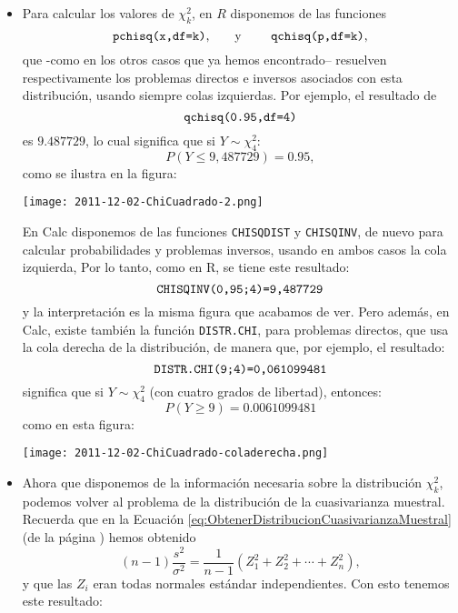 \begin{itemize}
    \item Para calcular los valores de $\chi^2_k$, en $R$ disponemos de las funciones
        \[\mbox{{\tt pchisq(x,df=k)},\qquad y \qquad {\tt qchisq(p,df=k)},}\]
        que -como en los otros casos que ya hemos encontrado-- resuelven respectivamente los problemas directos e inversos asociados con esta distribución, usando siempre colas izquierdas. Por ejemplo, el resultado de    \[\mbox{\tt qchisq(0.95,df=4)}\]
        es $9.487729$, lo cual significa que si $Y\sim\chi^2_4$:
        \[P(Y\leq 9,487729)=0.95,\]
        como se ilustra en la figura:
        \begin{center}
        \texttt{[image: 2011-12-02-ChiCuadrado-2.png]}
        \end{center}
        En Calc disponemos de las funciones {\tt CHISQDIST} y {\tt CHISQINV}, de nuevo para calcular probabilidades y problemas inversos, usando en ambos casos la cola izquierda, Por lo tanto, como en R, se tiene este resultado:
        \[\mbox{\tt CHISQINV(0,95;4)=9,487729}\]
        y la interpretación es la misma figura que acabamos de ver. Pero además, en Calc,  existe también la función {\tt DISTR.CHI}, para problemas directos, que usa la cola derecha de la distribución, de manera que, por ejemplo, el resultado:
        \[\mbox{\tt DISTR.CHI(9;4)=0,061099481}\]
        significa que si $Y\sim\chi^2_4$ (con cuatro grados de libertad), entonces:
        \[P(Y\geq 9)=0.0061099481\]
        como en esta figura:
        \begin{center}
        \texttt{[image: 2011-12-02-ChiCuadrado-coladerecha.png]}
        \end{center}

    \item Ahora que disponemos de la información necesaria sobre la distribución $\chi^2_k$, podemos volver al problema de la distribución de la cuasivarianza muestral. Recuerda que en la Ecuación \ref{eq:ObtenerDistribucionCuasivarianzaMuestral} (de la página \pageref{eq:ObtenerDistribucionCuasivarianzaMuestral}) hemos obtenido
        \[(n-1)\dfrac{s^2}{\sigma^2}=\dfrac{1}{n-1}(Z_1^2+Z_2^2+\cdots+Z_n^2),\]
        y que las $Z_i$ eran todas normales estándar independientes. Con esto tenemos este resultado:\\[3mm]
       \\[3mm]


\end{itemize}
